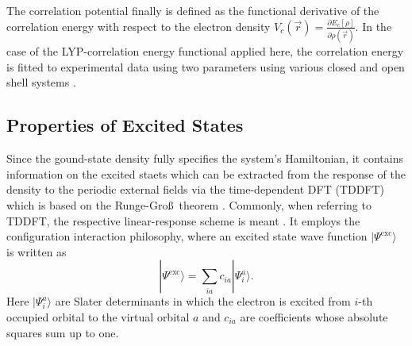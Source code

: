 The correlation potential finally is defined as the functional derivative of the correlation energy with respect to the electron density $V_c(\vec{r})=\frac{\partial E_c[\rho]}{\partial\rho(\vec{r})}$.
In the case of the LYP-correlation energy functional applied here, the correlation energy is fitted to experimental data using two parameters using various closed and open shell systems \cite{lyp}.

\subsection{Properties of Excited States}
\label{ch:tddft}
Since the gound-state density fully specifies the system's Hamiltonian, it contains information on the excited staets which can be extracted from the response of the density to the periodic external fields via the time-dependent DFT (TDDFT) which is based on the Runge-Gro\ss\, theorem \cite{RungeGross}.
Commonly, when referring to TDDFT, the respective linear-response scheme is meant \cite{dreuw}.
It employs the configuration interaction philosophy, where an excited state wave function $|\Psi^\text{exc}\rangle$ is written as
\begin{equation} \label{eq:excCI}
|\Psi^\text{exc}\rangle=\sum_{ia} c_{ia} |\Psi_i^a\rangle.
\end{equation}
Here $|\Psi_i^a\rangle$ are Slater determinants in which the electron is excited from $i$-th occupied orbital to the virtual orbital $a$ and $c_{ia}$ are coefficients whose absolute squares sum up to one.


